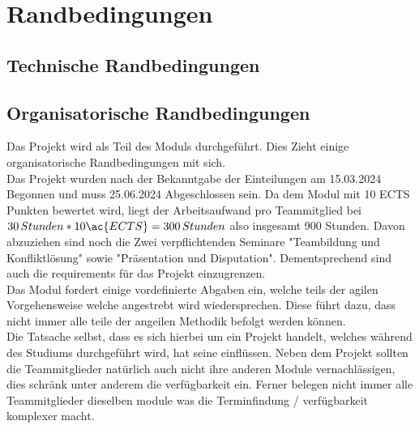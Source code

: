 \chapter{Randbedingungen}\label{ch:randbedingungen}


\section{Technische Randbedingungen}\label{sec:technische-randbedingungen}

\section{Organisatorische Randbedingungen}\label{sec:organisatorische-randbedingungen}

Das Projekt \workTitel wird als Teil des Moduls \workTyp durchgeführt.
Dies Zieht einige organisatorische Randbedingungen mit sich.\\
Das Projekt wurden nach der Bekanntgabe der Einteilungen am 15.03.2024 Begonnen und muss 25.06.2024 Abgeschlossen sein.
Da dem Modul mit 10 \ac{ECTS} Punkten bewertet wird, liegt der Arbeitsaufwand pro Teammitglied bei \(30\,Stunden * 10 \ac{ECTS} = 300\,Stunden\) also insgesamt 900 Stunden.
Davon abzuziehen sind noch die Zwei verpflichtenden Seminare "Teambildung und Konfliktlösung" sowie "Präsentation und Disputation".
Dementsprechend sind auch die requirements für das Projekt einzugrenzen.\\

Das Modul fordert einige vordefinierte Abgaben ein, welche teils der agilen Vorgehensweise welche angestrebt wird wiedersprechen.
Diese führt dazu, dass nicht immer alle teile der angeilen Methodik befolgt werden können.\\

Die Tatsache selbst, dass es sich hierbei um ein Projekt handelt, welches während des Studiums durchgeführt wird, hat seine einflüssen.
Neben dem Projekt sollten die Teammitglieder natürlich auch nicht ihre anderen Module vernachlässigen, dies schränk unter anderem die verfügbarkeit ein.
Ferner belegen nicht immer alle Teammitglieder dieselben module was die Terminfindung / verfügbarkeit komplexer macht.